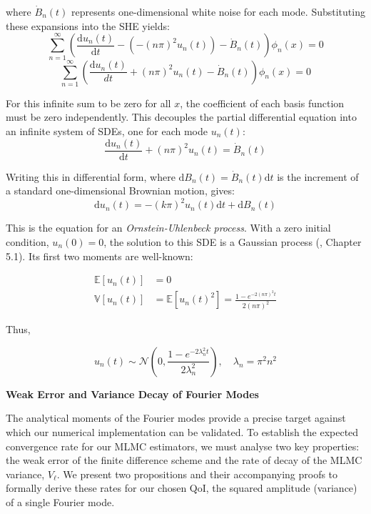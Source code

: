 where $\dot{B}_n(t)$ represents one-dimensional white noise for each mode.
Substituting these expansions into the SHE yields:
$$\sum_{n=1}^\infty \left( \frac{\mathrm{d}u_n(t)}{\mathrm{d}t} - (-(n\pi)^2 u_n(t)) 
- \dot{B}_n(t) \right) \phi_n(x) = 0$$ $$\sum_{n=1}^\infty \left( \frac{\mathrm{d}u_n(t)}{dt}
 + (n\pi)^2 u_n(t) - \dot{B}_n(t) \right) \phi_n(x) = 0
 $$

For
this infinite sum to be zero for all $x$, the coefficient of each basis
function must be zero independently. This decouples the partial differential 
equation into an infinite system of SDEs, one for each mode 
$u_n(t)$: 
$$\frac{\mathrm{d}u_n(t)}{\mathrm{d}t} + (n\pi)^2 u_n(t) = \dot{B}_n(t)$$

Writing this in differential form, where $\mathrm{d}B_n(t) = 
\dot{B}_n(t)\mathrm{d}t$ is the 
increment of a standard one-dimensional Brownian motion, 
gives:
$$
\mathrm{d}u_n(t) = -(k\pi)^2 u_n(t)\mathrm{d}t + \mathrm{d}B_n(t)
$$ 

This is the equation for an \textit{Ornstein-Uhlenbeck process}.
With a zero initial condition, $u_n(0)=0$, the solution to 
this SDE is a Gaussian process (\cite{oksendal2013stochastic}, Chapter 5.1). 
Its first two moments are well-known:

\begin{align}\label{eq:moments_of_fourier_modes}
\mathbb{E}[u_n(t)] &= 0 \\
\mathbb{V}[u_n(t)] &= \mathbb{E}[u_n(t)^2] = 
 \frac{1 - e^{-2(n\pi)^2 t}}{2(n\pi)^2} \label{eq:var_fourier_modes}
\end{align}

Thus,

\begin{equation}
    u_n(t) \sim \mathcal{N}(0, 
    \frac{1-e^{-2\lambda_n^2t}}{2\lambda_n^2}), 
    \quad \lambda_n = \pi^2 n^2
\end{equation}
\newline

\textbf{Weak Error and Variance Decay of Fourier Modes}

The analytical moments of the Fourier modes provide a precise target against 
which our numerical implementation can be validated. To establish the expected 
convergence rate for our MLMC estimators, we must analyse two key properties:
the weak error of the finite difference scheme and the rate 
of decay of the MLMC variance, $V_\ell$. We present 
two propositions and their accompanying proofs to formally 
derive these rates for our chosen QoI, the squared amplitude (variance)
of a single Fourier mode. 


